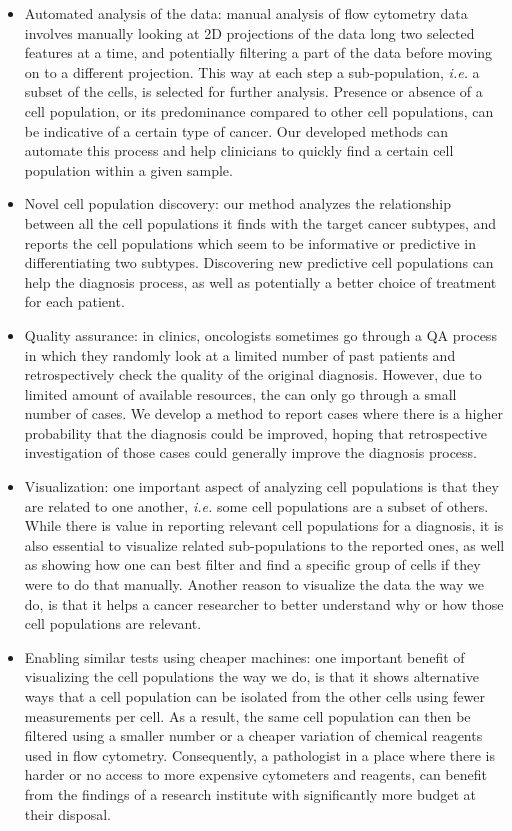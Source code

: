 \begin{itemize}
  \item Automated analysis of the data: manual analysis of flow cytometry data
    involves manually looking at 2D projections of the data long two selected
    features at a time, and potentially filtering a part of the data before
    moving on to a different projection. This way at each step a
    sub-population, \emph{i.e.} a subset of the cells, is selected for further
    analysis. Presence or absence of a cell population, or its predominance
    compared to other cell populations, can be indicative of a certain type of
    cancer. Our developed methods can automate this process and help clinicians
    to quickly find a certain cell population within a given sample.
  \item Novel cell population discovery: our method analyzes the relationship
    between all the cell populations it finds with the target cancer subtypes,
    and reports the cell populations which seem to be informative or predictive
    in differentiating two subtypes. Discovering new predictive cell
    populations can help the diagnosis process, as well as potentially a better
    choice of treatment for each patient.
  \item Quality assurance: in clinics, oncologists sometimes go through a QA
    process in which they randomly look at a limited number of past patients
    and retrospectively check the quality of the original diagnosis. However,
    due to limited amount of available resources, the can only go through a
    small number of cases. We develop a method to report cases where there is a
    higher probability that the diagnosis could be improved, hoping that
    retrospective investigation of those cases could generally improve the
    diagnosis process.
  \item Visualization: one important aspect of analyzing cell populations is
    that they are related to one another, \emph{i.e.} some cell populations are
    a subset of others. While there is value in reporting relevant cell
    populations for a diagnosis, it is also essential to visualize related
    sub-populations to the reported ones, as well as showing how one can best
    filter and find a specific group of cells if they were to do that manually.
    Another reason to visualize the data the way we do, is that it helps a
    cancer researcher to better understand why or how those cell populations
    are relevant.
  \item Enabling similar tests using cheaper machines: one important benefit of
    visualizing the cell populations the way we do, is that it shows
    alternative ways that a cell population can be isolated from the other
    cells using fewer measurements per cell. As a result, the same cell
    population can then be filtered using a smaller number or a cheaper
    variation of chemical reagents used in flow cytometry. Consequently, a
    pathologist in a place where there is harder or no access to more expensive
    cytometers and reagents, can benefit from the findings of a research
    institute with significantly more budget at their disposal.
\end{itemize}

